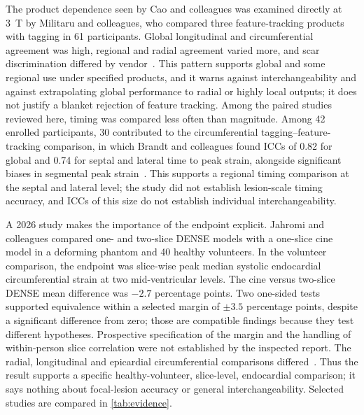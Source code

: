 The product dependence seen by Cao and colleagues was examined directly at 3~T by Militaru and colleagues, who compared three feature-tracking products with tagging in 61 participants. Global longitudinal and circumferential agreement was high, regional and radial agreement varied more, and scar discrimination differed by vendor~\cite{militaru2021}. This pattern supports global and some regional use under specified products, and it warns against interchangeability and against extrapolating global performance to radial or highly local outputs; it does not justify a blanket rejection of feature tracking. Among the paired studies reviewed here, timing was compared less often than magnitude. Among 42 enrolled participants, 30 contributed to the circumferential tagging--feature-tracking comparison, in which Brandt and colleagues found ICCs of 0.82 for global and 0.74 for septal and lateral time to peak strain, alongside significant biases in segmental peak strain~\cite{brandt2024}. This supports a regional timing comparison at the septal and lateral level; the study did not establish lesion-scale timing accuracy, and ICCs of this size do not establish individual interchangeability.

A 2026 study makes the importance of the endpoint explicit. Jahromi and colleagues compared one- and two-slice DENSE models with a one-slice cine model in a deforming phantom and 40 healthy volunteers. In the volunteer comparison, the endpoint was slice-wise peak median systolic endocardial circumferential strain at two mid-ventricular levels. The cine versus two-slice DENSE mean difference was \(-2.7\) percentage points. Two one-sided tests supported equivalence within a selected margin of \(\pm3.5\) percentage points, despite a significant difference from zero; those are compatible findings because they test different hypotheses. Prospective specification of the margin and the handling of within-person slice correlation were not established by the inspected report. The radial, longitudinal and epicardial circumferential comparisons differed~\cite{jahromi2026densecine}. Thus the result supports a specific healthy-volunteer, slice-level, endocardial comparison; it says nothing about focal-lesion accuracy or general interchangeability. Selected studies are compared in \cref{tab:evidence}.

